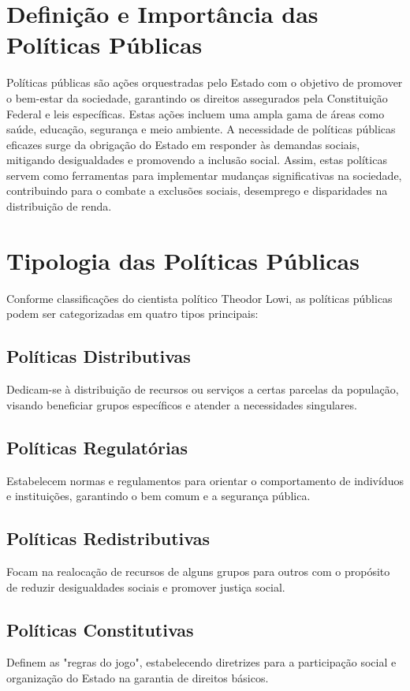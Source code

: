 \documentclass[
   article,       
   12pt,          
   oneside,       
   a4paper,       
   english,       
   brazil,        
   sumario=tradicional
   ]{abntex2}
\begin{document}
\section{Definição e Importância das Políticas Públicas}
Políticas públicas são ações orquestradas pelo Estado com o objetivo de promover o bem-estar da sociedade, garantindo os direitos assegurados pela Constituição Federal e leis específicas. Estas ações incluem uma ampla gama de áreas como saúde, educação, segurança e meio ambiente. A necessidade de políticas públicas eficazes surge da obrigação do Estado em responder às demandas sociais, mitigando desigualdades e promovendo a inclusão social. Assim, estas políticas servem como ferramentas para implementar mudanças significativas na sociedade, contribuindo para o combate a exclusões sociais, desemprego e disparidades na distribuição de renda.

\section{Tipologia das Políticas Públicas}
Conforme classificações do cientista político Theodor Lowi, as políticas públicas podem ser categorizadas em quatro tipos principais:

\subsection{Políticas Distributivas}
Dedicam-se à distribuição de recursos ou serviços a certas parcelas da população, visando beneficiar grupos específicos e atender a necessidades singulares.

\subsection{Políticas Regulatórias}
Estabelecem normas e regulamentos para orientar o comportamento de indivíduos e instituições, garantindo o bem comum e a segurança pública.

\subsection{Políticas Redistributivas}
Focam na realocação de recursos de alguns grupos para outros com o propósito de reduzir desigualdades sociais e promover justiça social.

\subsection{Políticas Constitutivas}
Definem as "regras do jogo", estabelecendo diretrizes para a participação social e organização do Estado na garantia de direitos básicos.
\end{document}
